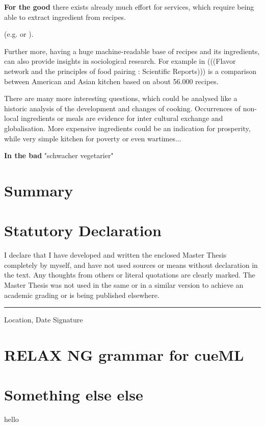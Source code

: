 \documentclass[12pt, twoside]{report}
\begin{document}
\textbf{For the good} there exists already much effort for services, which require being able to extract ingredient from recipes.

 (e.g. \cite{ingredientNetworks} or \cite{recipeRecommendation}).

Further more, having a huge machine-readable base of recipes and its ingredients, can also provide insights in sociological research. For example in (((Flavor network and the principles of food pairing : Scientific Reports))) is a comparison between American and Asian kitchen based on about 56.000 recipes.

There are many more interesting questions, which could be analysed like a historic analysis of the development and changes of cooking. Occurrences of non-local ingredients or meals are evidence for inter cultural exchange and globalisation. More expensive ingredients could be an indication for prosperity, while very simple kitchen for poverty or even wartimes...
\bigskip

\textbf{In the bad} \parencite{clintonHealth} "schwacher vegetarier"


\chapter{Summary}


\appendix
\chapter{Statutory Declaration}
I declare that I have developed and written the enclosed Master Thesis completely by myself, and have not used sources or means without declaration in the text. Any thoughts from others or literal quotations are clearly marked. The Master Thesis was not used in the same or in a similar version to achieve an academic grading or is being published elsewhere.
\newline
\newline
\newline
\rule{\textwidth}{1pt}
Location, Date \hfill Signature 

\chapter{RELAX NG grammar for cueML}
\label{appendix:grammaCueML}

\chapter{Something else else}
hello

\printbibliography
\end{document}
